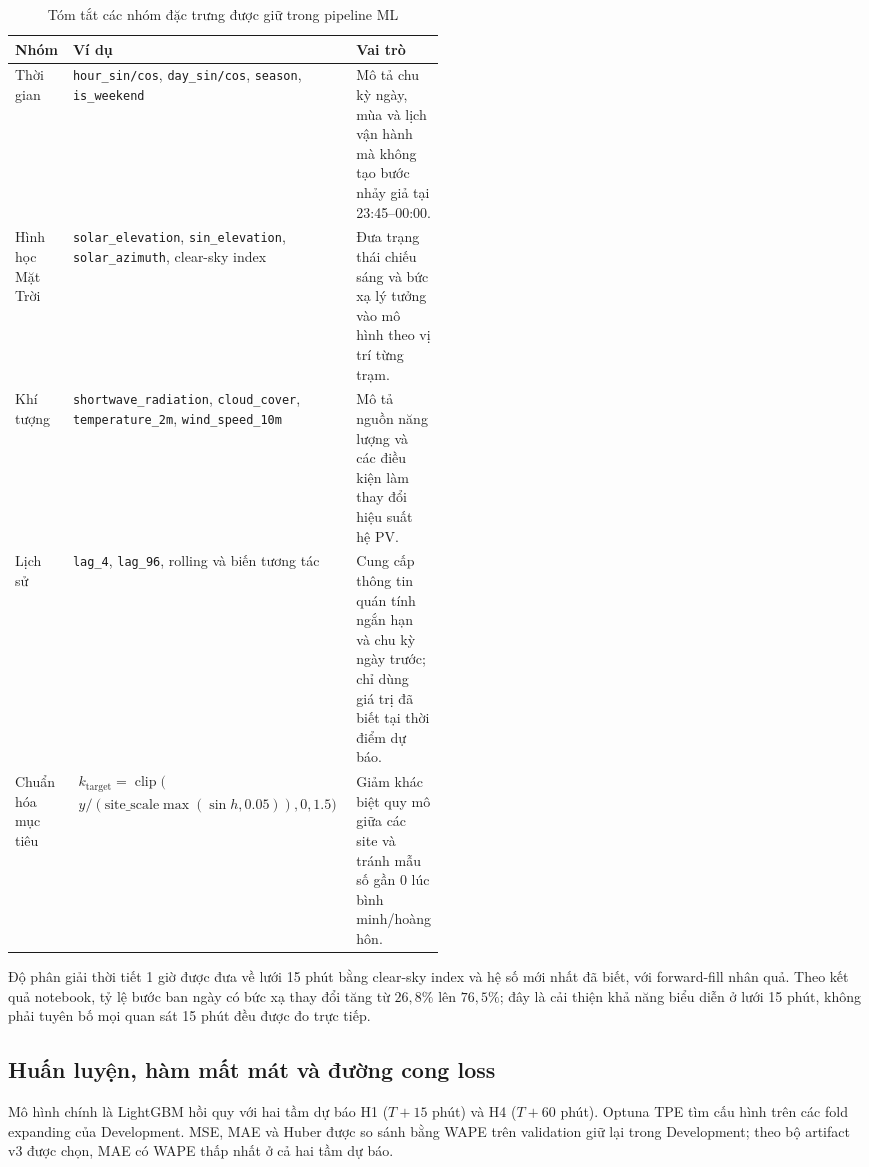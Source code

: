 \documentclass[12pt,a4paper]{article}
\begin{document}
\begin{table}[H]
\centering
\caption{Tóm tắt các nhóm đặc trưng được giữ trong pipeline ML}
\label{tab:ml_feature_groups_compact}
\scriptsize
\begin{tabularx}{\linewidth}{>{\raggedright\arraybackslash}p{0.14\linewidth} >{\raggedright\arraybackslash}p{0.36\linewidth} >{\raggedright\arraybackslash}X}
\toprule
\textbf{Nhóm} & \textbf{Ví dụ} & \textbf{Vai trò} \\
\midrule
Thời gian & \texttt{hour\_sin/cos}, \texttt{day\_sin/cos}, \texttt{season}, \texttt{is\_weekend} & Mô tả chu kỳ ngày, mùa và lịch vận hành mà không tạo bước nhảy giả tại 23:45--00:00. \\
Hình học Mặt Trời & \texttt{solar\_elevation}, \texttt{sin\_elevation}, \texttt{solar\_azimuth}, clear-sky index & Đưa trạng thái chiếu sáng và bức xạ lý tưởng vào mô hình theo vị trí từng trạm. \\
Khí tượng & \texttt{shortwave\_radiation}, \texttt{cloud\_cover}, \texttt{temperature\_2m}, \texttt{wind\_speed\_10m} & Mô tả nguồn năng lượng và các điều kiện làm thay đổi hiệu suất hệ PV. \\
Lịch sử & \texttt{lag\_4}, \texttt{lag\_96}, rolling và biến tương tác & Cung cấp thông tin quán tính ngắn hạn và chu kỳ ngày trước; chỉ dùng giá trị đã biết tại thời điểm dự báo. \\
Chuẩn hóa mục tiêu & $\begin{gathered} k_{\text{target}}=\operatorname{clip}(\\[-2pt] y/(\text{site\_scale}\max(\sin h,0.05)),0,1.5) \end{gathered}$ & Giảm khác biệt quy mô giữa các site và tránh mẫu số gần $0$ lúc bình minh/hoàng hôn. \\
\bottomrule
\end{tabularx}
\end{table}

Độ phân giải thời tiết 1 giờ được đưa về lưới 15 phút bằng clear-sky index và hệ số mới nhất đã biết, với forward-fill nhân quả. Theo kết quả notebook, tỷ lệ bước ban ngày có bức xạ thay đổi tăng từ $26,8\%$ lên $76,5\%$; đây là cải thiện khả năng biểu diễn ở lưới 15 phút, không phải tuyên bố mọi quan sát 15 phút đều được đo trực tiếp.

\subsection{Huấn luyện, hàm mất mát và đường cong loss}
Mô hình chính là LightGBM hồi quy với hai tầm dự báo H1 ($T+15$ phút) và H4 ($T+60$ phút). Optuna TPE tìm cấu hình trên các fold expanding của Development. MSE, MAE và Huber được so sánh bằng WAPE trên validation giữ lại trong Development; theo bộ artifact v3 được chọn, MAE có WAPE thấp nhất ở cả hai tầm dự báo.
\end{document}
